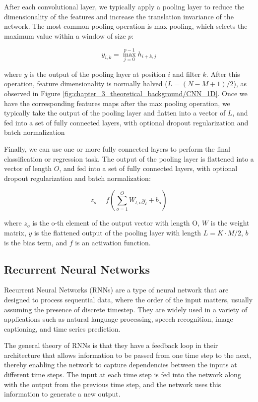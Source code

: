 After each convolutional layer, we typically apply a pooling layer to reduce the dimensionality of the features and increase the translation invariance of the network. The most common pooling operation is max pooling, which selects the maximum value within a window of size $p$:

\begin{equation}
y_{i,k} = \max_{j=0}^{p-1} h_{i+k,j}
\end{equation}

where $y$ is the output of the pooling layer at position $i$ and filter $k$. After this operation, feature dimensionality is normally halved ($L = (N-M+1) / 2$), as observed in Figure \ref{fig:chapter_3_theoretical_background/CNN_1D}. Once we have the corresponding features maps after the max pooling operation, we typically take the output of the pooling layer and flatten into a vector of $L$, and fed into a set of fully connected layers, with optional dropout regularization and batch normalization

Finally, we can use one or more fully connected layers to perform the final classification or regression task. The output of the pooling layer is flattened into a vector of length $O$, and fed into a set of fully connected layers, with optional dropout regularization and batch normalization:

\begin{equation}
z_o = f(\sum_{o=1}^O W_{l,o} y_l + b_o)
\end{equation}

where $z_{o}$ is the o-th element of the output vector with length O, $W$ is the weight matrix, $y$ is the flattened output of the pooling layer with length $L = K · M/2$, $b$ is the bias term, and $f$ is an activation function. 

\subsection{Recurrent Neural Networks}
\label{subsec:3_rnns}

Recurrent Neural Networks (RNNs) are a type of neural network that are designed to process sequential data, where the order of the input matters, usually assuming the presence of discrete timestep. They are widely used in a variety of applications such as natural language processing, speech recognition, image captioning, and time series prediction.

The general theory of RNNs is that they have a feedback loop in their architecture that allows information to be passed from one time step to the next, thereby enabling the network to capture dependencies between the inputs at different time steps. The input at each time step is fed into the network along with the output from the previous time step, and the network uses this information to generate a new output.

